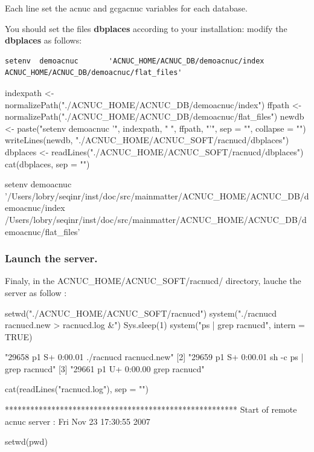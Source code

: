 \documentclass{article}
\begin{document}
Each line set the acnuc and gcgacnuc variables for each   database.


You should set the files \textbf{dbplaces}  according to your installation:
 modify  the \textbf{dbplaces} as follows:
\begin{verbatim}
setenv  demoacnuc       'ACNUC_HOME/ACNUC_DB/demoacnuc/index ACNUC_HOME/ACNUC_DB/demoacnuc/flat_files'
\end{verbatim}

\begin{Schunk}
\begin{Sinput}
 indexpath <- normalizePath("./ACNUC_HOME/ACNUC_DB/demoacnuc/index")
 ffpath <- normalizePath("./ACNUC_HOME/ACNUC_DB/demoacnuc/flat_files")
 newdb <- paste("setenv demoacnuc '", indexpath, " ", ffpath, 
     "'", sep = "", collapse = "")
 writeLines(newdb, "./ACNUC_HOME/ACNUC_SOFT/racnucd/dbplaces")
 dbplaces <- readLines("./ACNUC_HOME/ACNUC_SOFT/racnucd/dbplaces")
 cat(dbplaces, sep = "\n")
\end{Sinput}
\begin{Soutput}
setenv demoacnuc '/Users/lobry/seqinr/inst/doc/src/mainmatter/ACNUC_HOME/ACNUC_DB/demoacnuc/index /Users/lobry/seqinr/inst/doc/src/mainmatter/ACNUC_HOME/ACNUC_DB/demoacnuc/flat_files'
\end{Soutput}
\end{Schunk}

\subsubsection{Launch the server.}


Finaly, in the ACNUC\_HOME/ACNUC\_SOFT/racnucd/ directory, lauche the server as follow :

\begin{Schunk}
\begin{Sinput}
 setwd("./ACNUC_HOME/ACNUC_SOFT/racnucd")
 system("./racnucd racnucd.new > racnucd.log &")
 Sys.sleep(1)
 system("ps | grep racnucd", intern = TRUE)
\end{Sinput}
\begin{Soutput}
[1] "29658  p1  S+     0:00.01 ./racnucd racnucd.new"  
[2] "29659  p1  S+     0:00.01 sh -c ps | grep racnucd"
[3] "29661  p1  U+     0:00.00 grep racnucd"           
\end{Soutput}
\begin{Sinput}
 cat(readLines("racnucd.log"), sep = "\n")
\end{Sinput}
\begin{Soutput}
*******************************************************
Start of remote acnuc server : Fri Nov 23 17:30:55 2007
\end{Soutput}
\begin{Sinput}
 setwd(pwd)
\end{Sinput}
\end{Schunk}
\end{document}
